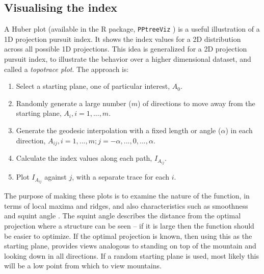 \documentclass[]{interact}
\theoremstyle{plain}%
\theoremstyle{definition}
\theoremstyle{remark}
\def\tightlist{}
\begin{document}
\hypertarget{visualising-the-index}{%
\subsection{\texorpdfstring{Visualising the index
\label{sec:viz}}{Visualising the index }}\label{visualising-the-index}}

A Huber plot \citep{huberpp} (available in the R package,
\texttt{PPtreeViz} \citep{pptreeviz}) is a useful illustration of a 1D
projection pursuit index. It shows the index values for a 2D
distribution across all possible 1D projections. This idea is
generalized for a 2D projection pursuit index, to illustrate the
behavior over a higher dimensional dataset, and called a \emph{topotrace
plot}. The approach is:

\begin{enumerate}
\def\labelenumi{\arabic{enumi}.}
\tightlist
\item
  Select a starting plane, one of particular interest, \(A_0\).
\item
  Randomly generate a large number (\(m\)) of directions to move away
  from the starting plane, \(A_i, i=1, ..., m\).
\item
  Generate the geodesic interpolation with a fixed length or angle
  (\(\alpha\)) in each direction,
  \(A_{ij}, i=1, ..., m; j=-\alpha, ..., 0, ..., \alpha\).
\item
  Calculate the index values along each path, \(I_{A_{ij}}\).
\item
  Plot \(I_{A_{ij}}\) against \(j\), with a separate trace for each
  \(i\).
\end{enumerate}

The purpose of making these plots is to examine the nature of the
function, in terms of local maxima and ridges, and also characteristics
such as smoothness and squint angle \citep{laa2020}. The squint angle
describes the distance from the optimal projection where a structure can
be seen -- if it is large then the function should be easier to
optimize. If the optimal projection is known, then using this as the
starting plane, provides views analogous to standing on top of the
mountain and looking down in all directions. If a random starting plane
is used, most likely this will be a low point from which to view
mountains.
\end{document}
